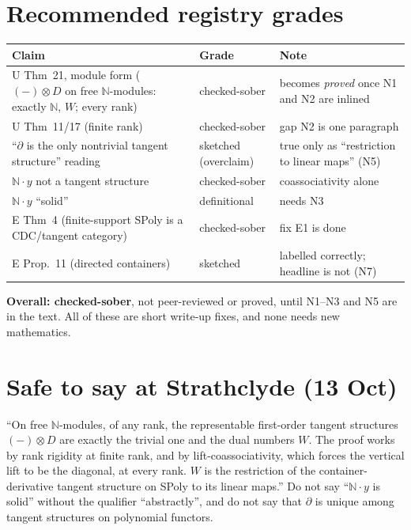 \documentclass[11pt]{article}
\newcommand{\N}{\mathbb{N}}
\begin{document}
\section{Recommended registry grades}
\begin{center}\small
\begin{tabular}{p{7.2cm}p{2.4cm}p{5.6cm}}
\toprule
Claim & Grade & Note\\\midrule
U Thm~21, module form ($(-)\otimes D$ on free $\N$-modules: exactly $\N$, $W$; every rank) &
checked-sober & becomes \emph{proved} once N1 and N2 are inlined\\
U Thm~11/17 (finite rank) & checked-sober & gap N2 is one paragraph\\
``$\partial$ is the only nontrivial tangent structure'' reading & sketched (overclaim) & true only
as ``restriction to linear maps'' (N5)\\
$\N\cdot y$ not a tangent structure & checked-sober & coassociativity alone\\
$\N\cdot y$ ``solid'' & definitional & needs N3\\
E Thm~4 (finite-support SPoly is a CDC/tangent category) & checked-sober & fix E1 is done\\
E Prop.~11 (directed containers) & sketched & labelled correctly; headline is not (N7)\\
\bottomrule
\end{tabular}
\end{center}
\textbf{Overall: checked-sober}, not peer-reviewed or proved, until N1--N3 and N5 are in the
text. All of these are short write-up fixes, and none needs new mathematics.

\section*{Safe to say at Strathclyde (13 Oct)}
``On free $\N$-modules, of any rank, the representable first-order tangent structures
$(-)\otimes D$ are exactly the trivial one and the dual numbers $W$. The proof works by rank
rigidity at finite rank, and by lift-coassociativity, which forces the vertical lift to be the
diagonal, at every rank. $W$ is the restriction of the container-derivative tangent structure on
SPoly to its linear maps.'' Do not say ``$\N\cdot y$ is solid'' without the qualifier
``abstractly'', and do not say that $\partial$ is unique among tangent structures on polynomial
functors.
\end{document}
